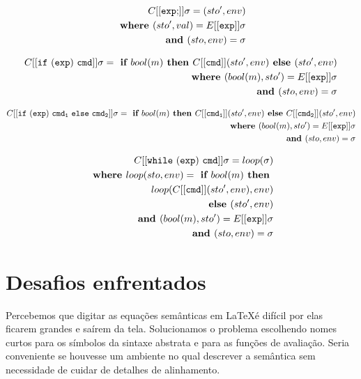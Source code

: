 \documentclass[12pt]{article}
\begin{document}
\begin{align*}
C[[{\tt exp;}]] \sigma = (sto', env) \\
\textbf{ where } (sto', val) = E[[{\tt exp}]] \sigma \\
\textbf{ and } (sto, env) = \sigma
\end{align*}

\begin{align*}
C[[{\tt if\ (exp)\ cmd}]] \sigma = \textbf{ if } bool(m) \textbf{ then } C[[{\tt cmd}]] (sto', env) \textbf{ else } (sto', env) \\
\textbf{ where } (bool(m), sto') = E[[{\tt exp}]] \sigma \\
\textbf{ and } (sto, env) = \sigma
\end{align*}


\begin{align*}
C[[{\tt if\ (exp)\ cmd_1\ else\ cmd_2}]] \sigma = \textbf{ if } bool(m) \textbf{ then } C[[{\tt cmd_1}]] (sto', env) \textbf{ else } C[[{\tt cmd_2}]] (sto', env) \\
\textbf{ where } (bool(m), sto') = E[[{\tt exp}]] \sigma \\
\textbf{ and } (sto, env) = \sigma
\end{align*}

\begin{align*}
C[[{\tt while\ (exp)\ cmd}]] \sigma = loop(\sigma) \\
\textbf{ where } loop(sto, env) = \textbf{ if } bool(m) \textbf{ then } \\
\text{\hspace{3em}} loop(C[[{\tt cmd}]] (sto', env), env) \\
\textbf{ else } (sto', env) \\
\textbf{ and } (bool(m), sto') = E[[{\tt exp}]] \sigma \\
\textbf{ and } (sto, env) = \sigma \\
\end{align*}

\section{Desafios enfrentados}
Percebemos que digitar as equações semânticas em \LaTeX é difícil por elas ficarem grandes e saírem da tela. Solucionamos o problema escolhendo nomes curtos para os símbolos da sintaxe abstrata e para as funções de avaliação. Seria conveniente se houvesse um ambiente no qual descrever a semântica sem necessidade de cuidar de detalhes de alinhamento. 
\end{document}
